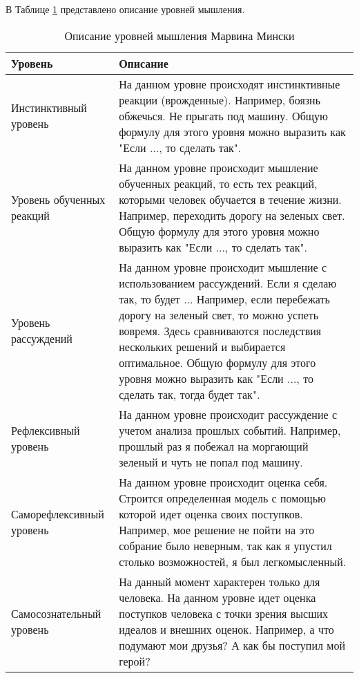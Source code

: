 В Таблице \ref{ThinkingLevelDescription} представлено описание уровней мышления.
\begin{table} [htbp]
  \centering
  \parbox{15cm}{\caption{Описание уровней мышления Марвина Мински}\label{ThinkingLevelDescription}}
  \begin{tabular}{| p{5cm} | p{11cm} |}
 
  \hline
\textbf{Уровень} & \textbf{Описание} \\
  \hline
 
Инстинктивный уровень	& На данном уровне происходят инстинктивные реакции (врожденные). Например, боязнь обжечься. Не прыгать под машину. Общую формулу для этого уровня можно выразить как "Если ..., то сделать так". \\
  \hline

Уровень обученных реакций  & На данном уровне происходит мышление обученных реакций, то есть тех реакций, которыми человек обучается в течение жизни. Например, переходить дорогу на зеленых свет. Общую формулу для этого уровня можно выразить как "Если ..., то сделать так". \\
  \hline

Уровень рассуждений & На данном уровне происходит мышление с использованием рассуждений. Если я сделаю так, то будет ... Например, если перебежать дорогу на зеленый свет, то можно успеть вовремя. Здесь сравниваются последствия нескольких решений и выбирается оптимальное. Общую формулу для этого уровня можно выразить как "Если ..., то сделать так, тогда будет так". \\
  \hline

Рефлексивный уровень  & На данном уровне происходит рассуждение с учетом анализа прошлых событий. Например, прошлый раз я побежал на моргающий зеленый и чуть не попал под машину. \\

  \hline
  Саморефлексивный уровень & На данном уровне происходит оценка себя. Строится определенная модель с помощью которой идет оценка своих поступков. Например, мое решение не пойти на это собрание было неверным, так как я упустил столько возможностей, я был легкомысленный. \\
  \hline
  Самосознательный уровень & На данный момент характерен только для человека. На данном уровне идет оценка поступков человека с точки зрения высших идеалов и внешних оценок. Например, а что подумают мои друзья? А как бы поступил мой герой? \\
  \hline
  
  \end{tabular}
\end{table}

